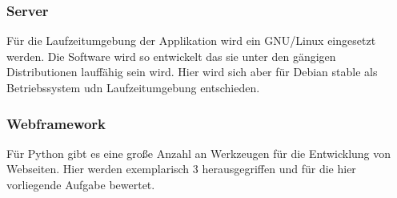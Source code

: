\subsubsection{Server}

Für die Laufzeitumgebung der Applikation wird ein GNU/Linux eingesetzt werden. Die Software wird so entwickelt das sie unter den gängigen Distributionen lauffähig sein wird. Hier wird sich aber für Debian stable als Betriebssystem udn Laufzeitumgebung entschieden.


% 
% 
% 

\subsubsection{Webframework}

Für Python gibt es eine große Anzahl an Werkzeugen für die Entwicklung von Webseiten. Hier werden exemplarisch 3 herausgegriffen und für die hier vorliegende Aufgabe bewertet.

